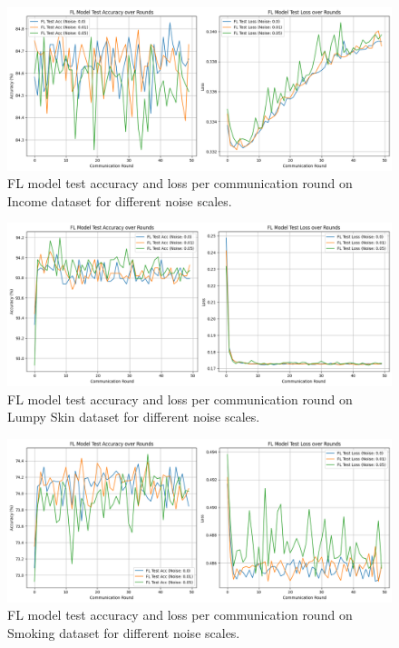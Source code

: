 \documentclass[10pt,twocolumn]{article}
\begin{document}
\begin{figure}[t]
    \centering
    \includegraphics[width=\textwidth]{income.png}
    \caption{FL model test accuracy and loss per communication round on Income dataset for different noise scales.}
    \label{fig:income}
\end{figure}
\begin{figure}[t]
    \centering
    \includegraphics[width=\textwidth]{lumpy.png}
    \caption{FL model test accuracy and loss per communication round on Lumpy Skin dataset for different noise scales.}
    \label{fig:lumpy}
\end{figure}
\begin{figure}[t]
    \centering
    \includegraphics[width=\textwidth]{smoking.png}
    \caption{FL model test accuracy and loss per communication round on Smoking dataset for different noise scales.}
    \label{fig:smoking}
\end{figure}
\end{document}
